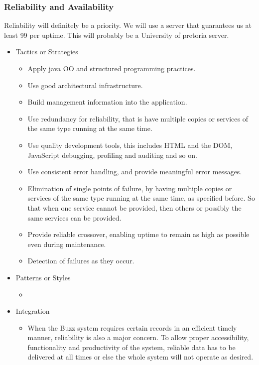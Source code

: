 \subsubsection{Reliability and Availability}
		Reliability will definitely be a priority. We will use a server that guarantees us at least 99 per uptime. This will probably be a University of pretoria server.
		\begin{itemize}
	\item{Tactics or Strategies}
		\begin{itemize}
			\item Apply java OO and structured programming practices.
			\item Use good architectural infrastructure.
			\item Build management information into the application.
			\item Use redundancy for reliability, that is have multiple copies or services of the same type running at the same time.
			\item Use quality development tools, this includes HTML and the DOM, JavaScript debugging, profiling and auditing and so on.
			\item Use consistent error handling, and provide meaningful error messages.
			\item Elimination of single points of failure, by having multiple copies or services of the same type running at the same time, as specified before. So that when one service cannot be provided, then others or possibly the same services can be provided.
			\item Provide reliable crossover, enabling uptime to remain as high as possible even during maintenance.
			\item Detection of failures as they occur.
		\end{itemize}
	\item{Patterns or Styles}
		\begin{itemize}
			\item
		\end{itemize}
	\item{Integration}
		\begin{itemize}
			\item When the Buzz system requires certain records in an efficient timely manner, reliability is also a major concern. To allow proper accessibility, functionality and productivity of the system, reliable data has to be delivered at all times or else the whole system will not operate as desired.
		\end{itemize}
\end{itemize}
		
